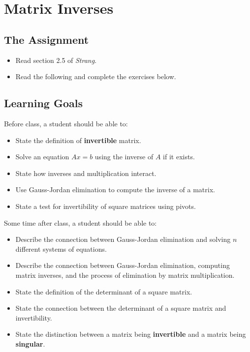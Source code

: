 \documentclass[10pt,]{book}
\newcommand{\terminology}[1]{\textbf{#1}}
\theoremstyle{plain}
\theoremstyle{definition}
\numberwithin{equation}{section}
\begin{document}
\section[Matrix Inverses]{Matrix Inverses}\label{inverse}
\typeout{************************************************}
\typeout{************************************************}
\subsection[The Assignment]{The Assignment}\label{subsection-41}
\begin{itemize}
\item{}Read section 2.5 of \emph{Strang}.\item{}Read the following and complete the exercises below.\end{itemize}
\typeout{************************************************}
\typeout{************************************************}
\subsection[Learning Goals]{Learning Goals}\label{subsection-42}

      Before class, a student should be able to:
\begin{itemize}
\item{}State the definition of \terminology{invertible} matrix.\item{}Solve an equation \(Ax = b\) using the inverse of \(A\)
        if it exists.
      \item{}State how inverses and multiplication interact.\item{}Use Gauss-Jordan elimination to compute the inverse of a matrix.\item{}State a test for invertibility of square matrices using pivots.\end{itemize}
\par

      Some time after class, a student should be able to:
\begin{itemize}
\item{}Describe the connection between Gauss-Jordan elimination and solving
        \(n\) different systems of equations.
      \item{}Describe the connection between Gauss-Jordan elimination, computing
        matrix inverses, and the process of elimination by matrix multiplication.
      \item{}State the definition of the determinant of a square matrix.\item{}State the connection between the determinant of a square matrix and
        invertibility.\item{}State the distinction between a matrix being \terminology{invertible}
        and a matrix being \terminology{singular}.
      \end{itemize}
\typeout{************************************************}
\typeout{************************************************}
\end{document}
